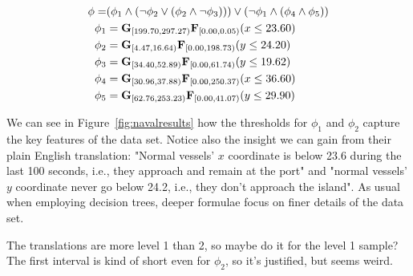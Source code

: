 \begin{equation}
\begin{aligned}
    \phi = & ( \phi_1 \wedge (\neg \phi_2 \vee (\phi_2 \wedge \neg \phi_3))) \vee (\neg \phi_1 \wedge (\phi_4 \wedge \phi_5)) \\
    \phi_1 & = \mathbf{G}_{[199.70, 297.27)} \mathbf{F}_{[0.00, 0.05)} (x \le 23.60) \\
    \phi_2 & = \mathbf{G}_{[4.47, 16.64)} \mathbf{F}_{[0.00, 198.73)} (y \le 24.20) \\
    \phi_3 & = \mathbf{G}_{[34.40, 52.89)} \mathbf{F}_{[0.00, 61.74)} (y \le 19.62) \\
    \phi_4 & = \mathbf{G}_{[30.96, 37.88)} \mathbf{F}_{[0.00, 250.37)} (x \le 36.60) \\
    \phi_5 & = \mathbf{G}_{[62.76, 253.23)} \mathbf{F}_{[0.00, 41.07)} (y \le 29.90)
\end{aligned}
\end{equation}

We can see in Figure~\ref{fig:navalresults} how the thresholds for $\phi_1$ and $\phi_2$ capture the key features of the data set. Notice also the insight we can gain from their plain English translation: "Normal vessels' $x$ coordinate is below 23.6 during the last 100 seconds, i.e., they approach and remain at the port" and "normal vessels' $y$ coordinate never go below 24.2, i.e., they don't approach the island". As usual when employing decision trees, deeper formulae focus on finer details of the data set.

{\color{blue} The translations are more level 1 than 2, so maybe do it for the level 1 sample? The first interval is kind of short even for $\phi_2$, so it's justified, but seems weird.}
